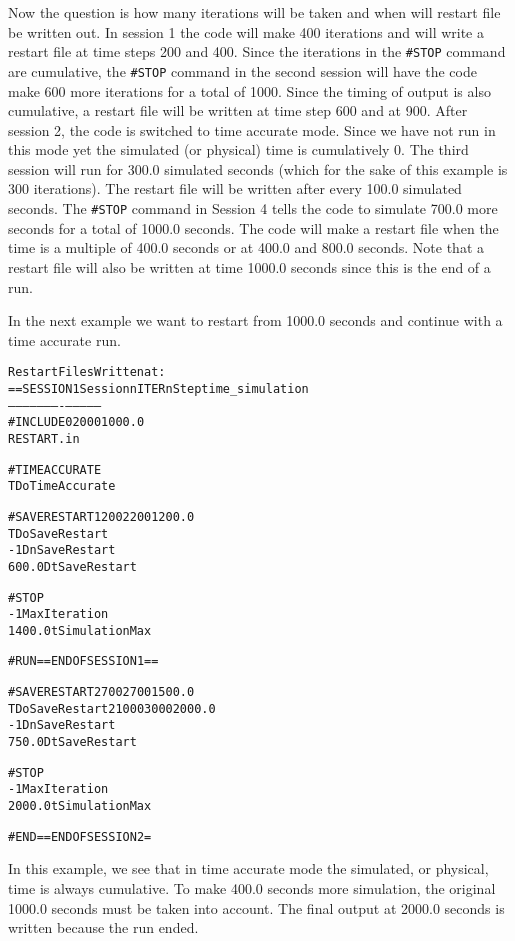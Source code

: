 Now the question is how many iterations will be taken and when will restart
file be written out.  In session 1 the code will make 400 iterations and will
write a restart file at time steps 200 and 400.  Since the iterations 
in the {\tt \#STOP}
command are cumulative, the {\tt \#STOP} command in the second session will
have the code make 600 more iterations for a total of 1000.  Since the timing
of output is also cumulative, a restart file will be written at time step 600
and at 900.
After session 2, the code is switched to time accurate mode.  Since we
have not run in this mode yet the simulated (or physical) time is cumulatively
0.  The third session will run for 300.0 simulated seconds (which for the
sake of this example is 300 iterations).  The restart file will be written
after every 100.0 simulated seconds.
The {\tt \#STOP} command in Session 4 tells the code to simulate  700.0 more 
seconds for a total of 1000.0 seconds.  The code will make a restart file
when the time is a multiple of 400.0 seconds or at 400.0 and 800.0 seconds.
Note that a restart file will also be written at time 1000.0
seconds since this is the end of a run.

In the next example we want to restart from 1000.0 seconds 
and continue with a time accurate run.
\begin{alltt}
                                             Restart Files Written at:
==SESSION 1      \hfill        Session   nITER   nStep    time_simulation
                 \hfill        --------  ------  -------  --------------
#INCLUDE                         \hfill            0     2000           1000.0
RESTART.in

#TIMEACCURATE
T            DoTimeAccurate  

#SAVERESTART                      \hfill  1       200     2200           1200.0
T            DoSaveRestart
-1           DnSaveRestart
600.0        DtSaveRestart

#STOP
-1           MaxIteration
1400.0       tSimulationMax

#RUN ==END OF SESSION 1== 

#SAVERESTART                      \hfill  2       700     2700           1500.0
T            DoSaveRestart	  \hfill  2      1000     3000           2000.0
-1           DnSaveRestart
750.0        DtSaveRestart

#STOP
-1           MaxIteration
2000.0       tSimulationMax

#END ==END OF SESSION 2 = 
                          
\end{alltt}
In this example, we see that in time accurate mode the simulated, or
physical, time is always cumulative.  To make 400.0 seconds more simulation,
the original 1000.0 seconds must be taken into account.  The final output 
at 2000.0 seconds is written because the run ended.

